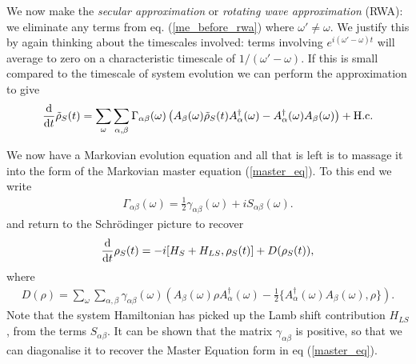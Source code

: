 We now make the \textit{secular approximation} or \textit{rotating wave approximation} (RWA): we eliminate any terms from eq. (\ref{me_before_rwa}) where $\omega' \neq \omega$. We justify this by again thinking about the timescales involved: terms involving $e^{i(\omega' - \omega)t}$ will average to zero on a characteristic timescale of $1/(\omega' - \omega)$. If this is small compared to the timescale of system evolution we can perform the approximation to give
\begin{align}
  \frac{\mathrm{d}}{\mathrm{d}t} \tilde{\rho}_S(t) = \sum_{\omega} \sum_{\alpha, \beta} \Gamma_{\alpha\beta}(\omega)\left(A_\beta(\omega)\tilde{\rho}_S(t)A^\dagger_\alpha(\omega) - A^\dagger_\alpha(\omega)A_\beta(\omega)\right) + \text{H.c}.
\end{align}

We now have a Markovian evolution equation and all that is left is to massage it into the form of the Markovian master equation (\ref{master_eq}). To this end we write
\begin{align}
  \Gamma_{\alpha \beta}(\omega) = \frac{1}{2}\gamma_{\alpha\beta}(\omega) + i S_{\alpha\beta}(\omega).
\end{align}
and return to the Schr\"odinger picture to recover
\begin{align}
  \frac{\mathrm{d}}{\mathrm{d}t} \rho_S(t) = -i[H_S + H_{LS}, \rho_S(t) ] + D(\rho_S(t)),
\end{align}
where
\begin{align}
 D(\rho) = \sum_\omega \sum_{\alpha, \beta} \gamma_{\alpha\beta}(\omega)\left(A_\beta(\omega)\rho A_\alpha^\dagger(\omega) - \frac{1}{2}\{A^\dagger_\alpha(\omega)A_\beta(\omega), \rho\} \right).
\end{align}
Note that the system Hamiltonian has picked up the Lamb shift contribution $H_{LS}$, from the terms $S_{\alpha\beta}$. It can be shown \cite{b+p} that the matrix $\gamma_{\alpha\beta}$ is positive, so that we can diagonalise it to recover the Master Equation form in eq (\ref{master_eq}).


